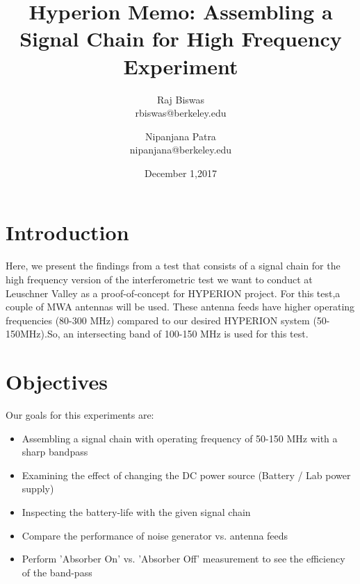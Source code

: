 \documentclass[11pt]{article}
\begin{document}
\title{Hyperion Memo: Assembling a Signal Chain for High Frequency Experiment}
\author{Raj Biswas\\rbiswas@berkeley.edu \and Nipanjana Patra \\nipanjana@berkeley.edu }

\date{December 1,2017}
\maketitle

\section{Introduction}
	Here, we present the findings from a test that consists of a signal chain for the high frequency version of the interferometric test we want to conduct at Leuschner Valley as a proof-of-concept for HYPERION project. For this test,a couple of MWA antennas will be used. These antenna feeds have higher operating frequencies (80-300 MHz) compared to our desired HYPERION system (50-150MHz).So, an intersecting band of 100-150 MHz is used for this test.

\section{Objectives}
	Our goals for this experiments are:
	\begin{itemize}
	\item Assembling a signal chain with operating frequency of 50-150 MHz with a sharp bandpass
	\item Examining the effect of changing the DC power source (Battery / Lab power supply)
	\item Inspecting the battery-life with the given signal chain
	\item Compare the performance of noise generator vs. antenna feeds
	\item Perform 'Absorber On' vs. 'Absorber Off' measurement to see the efficiency of the band-pass
	\end{itemize}
\end{document}
